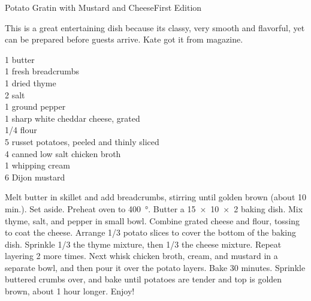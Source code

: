 \begin{entry}{Potato Gratin with Mustard and Cheese}{First Edition}

\begin{open}
  This is a great entertaining dish because its classy, very smooth and
  flavorful, yet can be prepared before guests arrive. Kate got it from
   magazine.
\end{open}
\begin{ingredients}
  \SI{1}{\tblspoon} butter\\
  \SI{1}{\cup} fresh breadcrumbs\\
  \SI{1}{\tblspoon} dried thyme\\
  \SI{2}{\teaspoon} salt\\
  \SI{1}{\teaspoon} ground pepper\\
  \SI{1}{\pound} sharp white cheddar cheese, grated\\
  \SI{1/4}{\cup} flour\\
  \SI{5}{\pound} russet potatoes, peeled and thinly sliced\\
  \SI{4}{\cup} canned low salt chicken broth\\
  \SI{1}{\cup} whipping cream\\
  \SI{6}{\tblspoon} Dijon mustard
\end{ingredients}
Melt butter in skillet and add breadcrumbs, stirring until golden brown (about
10 min.). Set aside. Preheat oven to \SI{400}{\degree}. Butter a
\SI{15x10x2}{\inch} baking dish. Mix thyme, salt, and pepper in small
bowl. Combine grated cheese and flour, tossing to coat the cheese. Arrange
\num{1/3} potato slices to cover the bottom of the baking dish. Sprinkle
\num{1/3} the thyme mixture, then \num{1/3} the cheese mixture. Repeat
layering 2 more times.  Next whisk chicken broth, cream, and mustard in a
separate bowl, and then pour it over the potato layers. Bake 30
minutes. Sprinkle buttered crumbs over, and bake until potatoes are tender and
top is golden brown, about 1 hour longer.  Enjoy!
\end{entry}